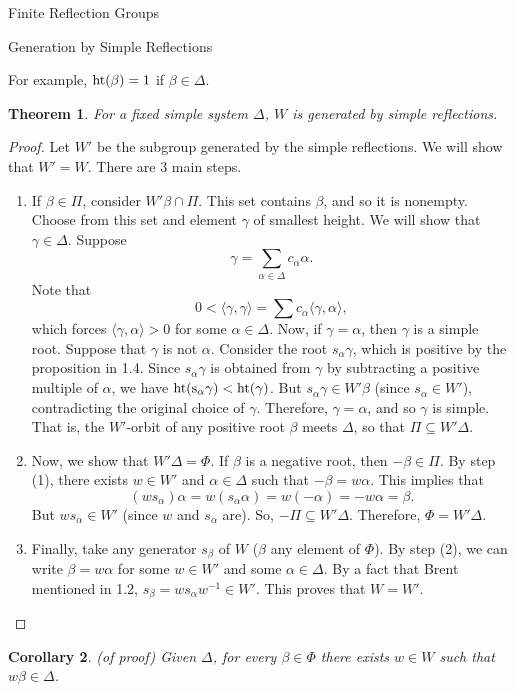 \documentclass[12pt]{nauthesis}
\newtheorem{theorem}{Theorem}[section]
\newtheorem{corollary}[theorem]{Corollary}
\theoremstyle{definition}
\renewcommand{\(}{\big(}
\renewcommand{\)}{\big)}
\begin{document}
\begin{flushleft}
\begin{chapter}{Finite Reflection Groups}
\begin{section}{Generation by Simple Reflections}
\medskip

For example, $\rm{ht}(\beta)=1$ if $\beta \in \Delta$.

\medskip
	
\begin{theorem}
For a fixed simple system $\Delta$, $W$ is generated by simple reflections.
\end{theorem}

\begin{proof}
Let $W'$ be the subgroup generated by the simple reflections.  We will show that $W'=W$.  There are 3 main steps.
\begin{enumerate}
  \item[(1)] If $\beta \in \Pi$, consider $W'\beta \cap \Pi$.  This set contains $\beta$, and so it is nonempty.  Choose from this set and element $\gamma$ of smallest height.  We will show that $\gamma \in \Delta$.  Suppose
  	$$\gamma=\sum_{\alpha \in \Delta} c_\alpha \alpha.$$
Note that 
	$$0<\langle \gamma, \gamma \rangle=\sum c_\alpha \langle \gamma, \alpha \rangle,$$
which forces $\langle \gamma, \alpha \rangle >0$ for some $\alpha \in \Delta$.  Now, if $\gamma=\alpha$, then $\gamma$ is a simple root.  Suppose that $\gamma$ is not $\alpha$.  Consider the root $s_\alpha \gamma$, which is positive by the proposition in 1.4.  Since $s_\alpha \gamma$ is obtained from $\gamma$ by subtracting a positive multiple of $\alpha$, we have $\rm{ht}(s_\alpha \gamma)< \rm{ht}(\gamma)$.  But $s_\alpha \gamma \in W'\beta$ (since $s_\alpha \in W'$), contradicting the original choice of $\gamma$.  Therefore, $\gamma=\alpha$, and so $\gamma$ is simple.  That is, the $W'$-orbit of any positive root $\beta$ meets $\Delta$, so that $\Pi \subseteq W'\Delta$.
  \item[(2)] Now, we show that $W'\Delta=\Phi$. If $\beta$ is a negative root, then $-\beta \in \Pi$.  By step (1), there exists $w \in W'$ and $\alpha \in \Delta$ such that $-\beta=w\alpha$.  This implies that 
  	$$(ws_\alpha)\alpha=w(s_\alpha \alpha)=w(-\alpha)=-w\alpha=\beta.$$
But $ws_\alpha \in W'$ (since $w$ and $s_\alpha$ are).  So, $-\Pi \subseteq W'\Delta$.  Therefore, $\Phi=W'\Delta$.
  \item[(3)] Finally, take any generator $s_\beta$ of $W$ ($\beta$ any element of $\Phi$).  By step (2), we can write $\beta=w\alpha$ for some $w \in W'$ and some $\alpha \in \Delta$.  By a fact that Brent mentioned in 1.2, $s_\beta=ws_\alpha w^{-1} \in W'$.  This proves that $W=W'$.
\end{enumerate}
\end{proof}

\begin{corollary}{\rm{(of proof)}}
Given $\Delta$, for every $\beta \in \Phi$ there exists $w \in W$ such that $w\beta \in \Delta$.
\end{corollary}

\end{section}

\end{chapter}

\end{flushleft}
\end{document}
